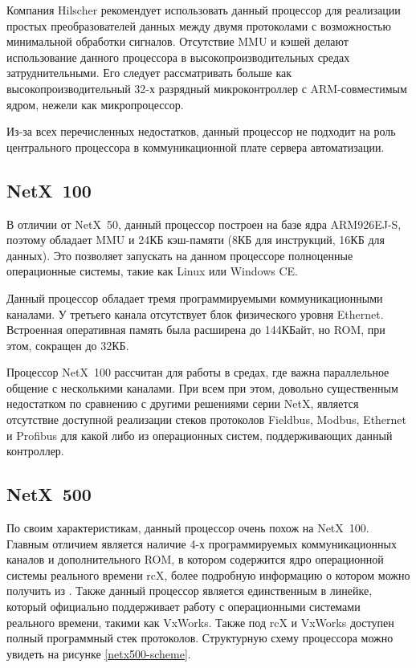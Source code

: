 \documentclass[a4paper,14pt,bachelor]{disser}
\begin{document}
Компания Hilscher рекомендует использовать данный процессор для реализации простых преобразователей данных между двумя протоколами с возможностью минимальной обработки сигналов. Отсутствие MMU и кэшей делают использование данного процессора в высокопроизводительных средах затруднительными. Его следует рассматривать больше как высокопроизводительный 32-х разрядный микроконтроллер с ARM-совместимым ядром, нежели как микропроцессор.

Из-за всех перечисленных недостатков, данный процессор не подходит на роль центрального процессора в коммуникационной плате сервера автоматизации.

\subsection{NetX~100}
В отличии от NetX~50, данный процессор построен на базе ядра ARM926EJ-S, поэтому обладает MMU и 24КБ кэш-памяти (8КБ для инструкций, 16КБ для данных). Это позволяет запускать на данном процессоре полноценные операционные системы, такие как Linux или Windows CE.

Данный процессор обладает тремя программируемыми коммуникационными каналами. У третьего канала отсутствует блок физического уровня Ethernet. Встроенная оперативная память была расширена до 144КБайт, но ROM, при этом, сокращен до 32КБ.

Процессор NetX~100 рассчитан для работы в средах, где важна параллельное общение с несколькими каналами. При всем при этом, довольно существенным недостатком по сравнению с другими решениями серии NetX, является отсутствие доступной реализации стеков протоколов Fieldbus, Modbus, Ethernet и Profibus для какой либо из операционных систем, поддерживающих данный контроллер.

\subsection{NetX~500}
По своим характеристикам, данный процессор очень похож на NetX~100. Главным отличием является наличие 4-х программируемых коммуникационных каналов и дополнительного ROM, в котором содержится ядро операционной системы реального времени rcX, более подробную информацию о котором можно получить из \cite[Programming reference guide]{rcX}. Также данный процессор является единственным в линейке, который официально поддерживает работу с операционными системами реального времени, такими как VxWorks. Также под rcX и VxWorks доступен полный программный стек протоколов. Структурную схему процессора можно увидеть на рисунке \ref{netx500-scheme}.
\end{document}
